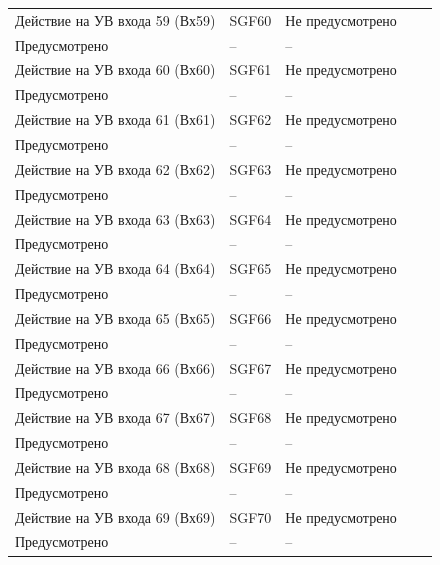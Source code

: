 \begin{longtable}{|>{\centering\arraybackslash}m{5.3cm}|>{\centering\arraybackslash}m{3.3cm}|>{\centering\arraybackslash}m{4.2cm}|>{\centering\arraybackslash}m{1.8cm}|>{\centering\arraybackslash}m{1cm}|}
\hline
\centering Действие на УВ входа 59 (Вх59)  & \centering SGF60 & \centering Не предусмотрено \\ Предусмотрено & \centering -- & \centering \arraybackslash -- \\
\hline
\centering Действие на УВ входа 60 (Вх60)  & \centering SGF61 & \centering Не предусмотрено \\ Предусмотрено & \centering -- & \centering \arraybackslash -- \\
\hline
\centering Действие на УВ входа 61 (Вх61)  & \centering SGF62 & \centering Не предусмотрено \\ Предусмотрено & \centering -- & \centering \arraybackslash -- \\
\hline
\centering Действие на УВ входа 62 (Вх62)  & \centering SGF63 & \centering Не предусмотрено \\ Предусмотрено & \centering -- & \centering \arraybackslash -- \\
\hline
\centering Действие на УВ входа 63 (Вх63)  & \centering SGF64 & \centering Не предусмотрено \\ Предусмотрено & \centering -- & \centering \arraybackslash -- \\
\hline
\centering Действие на УВ входа 64 (Вх64)  & \centering SGF65 & \centering Не предусмотрено \\ Предусмотрено & \centering -- & \centering \arraybackslash -- \\
\hline
\centering Действие на УВ входа 65 (Вх65)  & \centering SGF66 & \centering Не предусмотрено \\ Предусмотрено & \centering -- & \centering \arraybackslash -- \\
\hline
\centering Действие на УВ входа 66 (Вх66)  & \centering SGF67 & \centering Не предусмотрено \\ Предусмотрено & \centering -- & \centering \arraybackslash -- \\
\hline
\centering Действие на УВ входа 67 (Вх67)  & \centering SGF68 & \centering Не предусмотрено \\ Предусмотрено & \centering -- & \centering \arraybackslash -- \\
\hline
\centering Действие на УВ входа 68 (Вх68)  & \centering SGF69 & \centering Не предусмотрено \\ Предусмотрено & \centering -- & \centering \arraybackslash -- \\
\hline
\centering Действие на УВ входа 69 (Вх69)  & \centering SGF70 & \centering Не предусмотрено \\ Предусмотрено & \centering -- & \centering \arraybackslash -- \\

\end{longtable}
